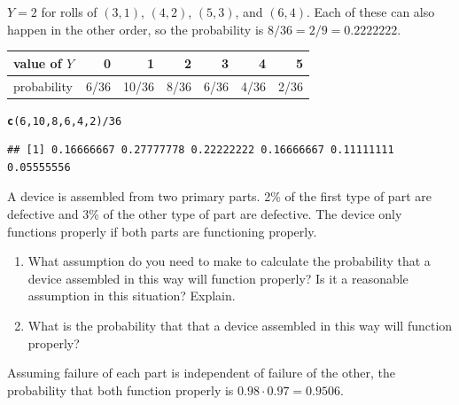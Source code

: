\documentclass[twoside]{book}\usepackage[]{graphicx}\usepackage[]{xcolor}
\makeatletter
\newcommand{\hlnum}[1]{\textcolor[rgb]{0.686,0.059,0.569}{#1}}%
\newcommand{\hlopt}[1]{\textcolor[rgb]{0,0,0}{#1}}%
\newcommand{\hlstd}[1]{\textcolor[rgb]{0.345,0.345,0.345}{#1}}%
\newcommand{\hlkwd}[1]{\textcolor[rgb]{0.737,0.353,0.396}{\textbf{#1}}}%
\newenvironment{kframe}{%
 \def\at@end@of@kframe{}%
 \ifinner\ifhmode%
  \def\at@end@of@kframe{\end{minipage}}%
  \begin{minipage}{\columnwidth}%
 \fi\fi%
 \def\FrameCommand##1{\hskip\@totalleftmargin \hskip-\fboxsep
 \colorbox{shadecolor}{##1}\hskip-\fboxsep
     \hskip-\linewidth \hskip-\@totalleftmargin \hskip\columnwidth}%
 \MakeFramed {\advance\hsize-\width
   \@totalleftmargin\z@ \linewidth\hsize
   \@setminipage}}%
 {\par\unskip\endMakeFramed%
 \at@end@of@kframe}
\newenvironment{knitrout}{}{} %
\makeatother
\begin{document}
\begin{solution}
	$Y = 2$ for rolls of $(3,1)$, $(4,2)$, $(5,3)$, and $(6,4)$.  Each of these 
	can also happen in the other order, so the probability is $8/36 = 2/9 = 0.2222222$.

\begin{center}
	\begin{tabular}{lrrrrrr}
		\hline
		value of $Y$ & 0 & 1 & 2 & 3 & 4 & 5 \\
		\hline
		probability & 6/36 & 10/36 & 8/36 & 6/36 & 4/36 & 2/36 \\
		\hline
	\end{tabular}
\end{center}
\begin{knitrout}
\color{fgcolor}\begin{kframe}
\begin{alltt}
\hlkwd{c}\hlstd{(}\hlnum{6}\hlstd{,}\hlnum{10}\hlstd{,}\hlnum{8}\hlstd{,}\hlnum{6}\hlstd{,}\hlnum{4}\hlstd{,}\hlnum{2}\hlstd{)} \hlopt{/} \hlnum{36}
\end{alltt}
\begin{verbatim}
## [1] 0.16666667 0.27777778 0.22222222 0.16666667 0.11111111 0.05555556
\end{verbatim}
\end{kframe}
\end{knitrout}
\end{solution}

\begin{problem}
	A device is assembled from two primary parts.  2\% of the first type of part
	are defective and 3\% of the other type of part are defective.  The device
	only functions properly if both parts are functioning properly.
	\begin{enumerate}
	\item
	What assumption do you need to make to calculate the probability
	that a device assembled in this way will function properly?
	Is it a reasonable assumption in this situation?  Explain.
	\item
	What is the probability that that a device assembled in this way will 
	function properly?
	\end{enumerate}
\end{problem}

\begin{solution}
	Assuming failure of each part is independent of failure of the other,
	the probability that both function properly is 
	$0.98 \cdot 0.97 = 0.9506$.
\end{solution}
\end{document}
